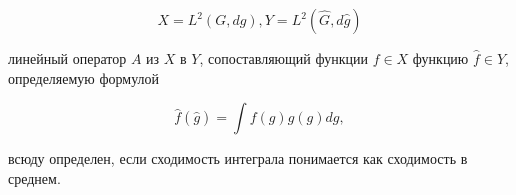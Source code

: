 \documentclass[10pt]{article}
\begin{document}
\[

X=L^{2}(G, d g), Y=L^{2}(\widehat{G}, d \hat{g})

\]



линейный оператор $A$ из $X$ в $Y$, сопоставляющий функции $f \in X$ функцию $\hat{f} \in Y$, определяемую формулой



\[

\hat{f}(\hat{g})=\int f(g) \hat{g}(g) d g,

\]



всюду определен, если сходимость интеграла понимается как сходимость в среднем.
\end{document}
